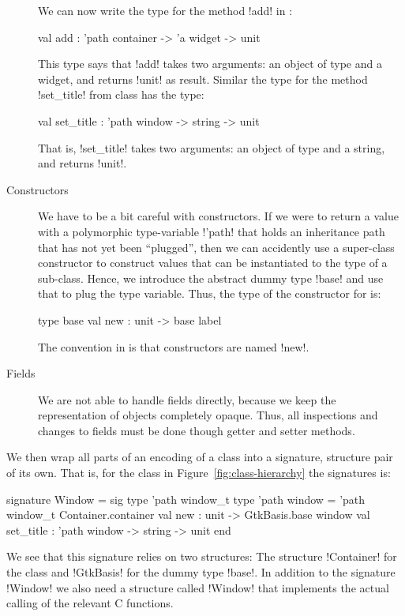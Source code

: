 \documentclass[workingdraft]{usetex-v1}
\begin{document}
\begin{description}
  We can now write the type for the method !add! in
  :
\begin{SMLcode}
val add : 'path container -> 'a widget 
                               -> unit
\end{SMLcode}
This type says that !add! takes two arguments: an object of type
 and a widget, and returns !unit! as result.
Similar the type for the method !set_title! from class
 has the type:
\begin{SMLcode}
val set_title : 'path window -> string 
                               -> unit
\end{SMLcode}
That is, !set_title! takes two arguments: an object of type 
 and a string, and returns !unit!.


\item[Constructors] We have to be a bit careful with constructors.  If
  we were to return a value with a polymorphic type-variable !'path!
  that holds an inheritance path that has not yet been ``plugged'',
  then we can accidently use a super-class constructor to construct
  values that can be instantiated to the type of a sub-class.  Hence,
  we introduce the abstract dummy type !base! and use that to plug the
  type variable.  Thus, the type of the constructor for
   is:
\begin{SMLcode}
type base
val new : unit -> base label
\end{SMLcode}
The convention in \gtk is that constructors are named !new!.

\item[Fields] We are not able to handle fields directly, because we
  keep the representation of objects completely opaque.  Thus, all
  inspections and changes to fields must be done though getter and
  setter methods.

\end{description}

We then wrap all parts of an encoding of a class into a signature,
structure pair of its own.  That is, for the class 
in Figure~\ref{fig:class-hierarchy} the \sml signatures is:
\begin{SMLcode}
signature Window =
sig
  type 'path window_t
  type 'path window = 
      'path window_t Container.container
  val new : unit -> GtkBasis.base window
  val set_title : 'path window -> string 
                                 -> unit
end
\end{SMLcode}
We see that this signature relies on two structures: The structure
!Container! for the class  and !GtkBasis! for the dummy
type !base!.  In addition to the signature !Window! we also need a
structure called !Window! that implements the actual calling of the
relevant \gtk C functions.
\end{document}

